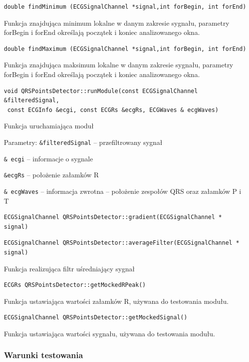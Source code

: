 \documentclass[a4paper, 11pt]{article}
\begin{document}
\begin{lstlisting}
double findMinimum (ECGSignalChannel *signal,int forBegin, int forEnd)
\end{lstlisting}
Funkcja znajdująca minimum lokalne w danym zakresie sygnału, parametry forBegin i forEnd
określają początek i koniec analizowanego okna.

\begin{lstlisting}
double findMaximum (ECGSignalChannel *signal,int forBegin, int forEnd)
\end{lstlisting}
Funkcja znajdująca maksimum lokalne w danym zakresie sygnału, parametry forBegin i forEnd
określają początek i koniec analizowanego okna.

\begin{lstlisting}
void QRSPointsDetector::runModule(const ECGSignalChannel &filteredSignal,
 const ECGInfo &ecgi, const ECGRs &ecgRs, ECGWaves & ecgWaves)
\end{lstlisting}
Funkcja uruchamiająca moduł

Parametry:
\verb|&filteredSignal| -- przefiltrowany sygnał

\verb|& ecgi| -- informacje o sygnale

\verb|&ecgRs| -- położenie załamków R

\verb|& ecgWaves| -- informacja zwrotna -- położenie zespołów QRS oraz załamków P i T

\begin{lstlisting}
ECGSignalChannel QRSPointsDetector::gradient(ECGSignalChannel * signal)
\end{lstlisting}

\begin{lstlisting}
ECGSignalChannel QRSPointsDetector::averageFilter(ECGSignalChannel * signal)
\end{lstlisting}

Funkcja realizująca filtr uśredniający sygnał

\begin{lstlisting}
ECGRs QRSPointsDetector::getMockedRPeak()
\end{lstlisting}
Funkcja ustawiająca wartości załamków R, używana do testowania modułu.

\begin{lstlisting}
ECGSignalChannel QRSPointsDetector::getMockedSignal()
\end{lstlisting}
Funkcja ustawiająca wartości sygnału, używana do testowania modułu.



\subsubsection{Warunki testowania}
\label{sec:waves:tests}
\end{document}

